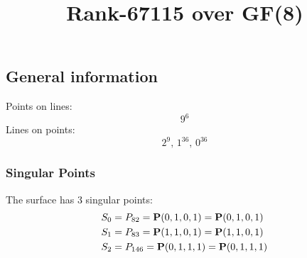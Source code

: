 \documentclass{article}
\newcommand\setTBstruts{\def\T{\rule{0pt}{2.6ex}}%
\def\B{\rule[-1.2ex]{0pt}{0pt}}}
\newcommand{\bP}{{\bf P}}
\begin{document}
 
\setTBstruts



{\allowdisplaybreaks%






\title{Rank-67115 over GF(8)}
\author{}%
\maketitle%
%
{}



\subsection*{General information}
Points on lines:
$$
9^6$$
Lines on points:
$$
2^9,\,1^{36},\,0^{36}$$
\subsubsection*{Singular Points}
The surface has 3 singular points:\\
\begin{align*}
S_{0} &= P_{82}=\bP(0, 1, 0, 1) = \bP(0, 1, 0, 1)\\
S_{1} &= P_{83}=\bP(1, 1, 0, 1) = \bP(1, 1, 0, 1)\\
S_{2} &= P_{146}=\bP(0, 1, 1, 1) = \bP(0, 1, 1, 1)\\
\end{align*}
}
\end{document}

